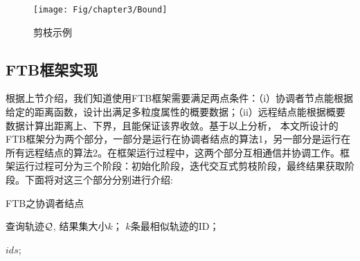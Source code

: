 \begin{figure}
	\centering
	\texttt{[image: Fig/chapter3/Bound]}
	\caption{剪枝示例}
	\label{fig-chapter3-Bound}
\end{figure}



\subsection{FTB框架实现}
根据上节介绍，我们知道使用FTB框架需要满足两点条件：（i）协调者节点能根据给定的距离函数，设计出满足多粒度属性的概要数据；（ii）远程结点能根据概要数据计算出距离上、下界，且能保证该界收敛。基于以上分析，
本文所设计的FTB框架分为两个部分，一部分是运行在协调者结点的算法1，另一部分是运行在所有远程结点的算法2。在框架运行过程中，这两个部分互相通信并协调工作。框架运行过程可分为三个阶段：初始化阶段，迭代交互式剪枝阶段，最终结果获取阶段。下面将对这三个部分分别进行介绍:

\begin{algorithm}[t]
	\caption{FTB之协调者结点}
	\label{alg:frame1-coordinator}
	\begin{algorithmic}[1]
		\REQUIRE 查询轨迹${\cal Q}$, 结果集大小$k$；
		\ENSURE $k$条最相似轨迹的ID；
		
				\label{a1:info}
				\ENDIF
		\ENDWHILE
		\RETURN $ids$; \label{a1:finalreturn}
	\end{algorithmic}
\end{algorithm}


